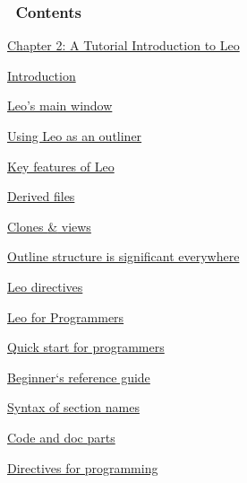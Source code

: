 \documentclass[10pt,a4paper,english]{article}
\begin{document}
\subsubsection*{~\hfill Contents\hfill ~}
\begin{list}{}{}
\item {} \href{\#chapter-2-a-tutorial-introduction-to-leo}{Chapter 2: A Tutorial Introduction to Leo}
\begin{list}{}{}
\item {} \href{\#introduction}{Introduction}
\begin{list}{}{}
\item {} \href{\#leo-s-main-window}{Leo's main window}

\item {} \href{\#using-leo-as-an-outliner}{Using Leo as an outliner}

\end{list}

\item {} \href{\#key-features-of-leo}{Key features of Leo}
\begin{list}{}{}
\item {} \href{\#derived-files}{Derived files}

\item {} \href{\#clones-views}{Clones {\&} views}

\item {} \href{\#outline-structure-is-significant-everywhere}{Outline structure is significant everywhere}

\item {} \href{\#leo-directives}{Leo directives}

\end{list}

\item {} \href{\#leo-for-programmers}{Leo for Programmers}
\begin{list}{}{}
\item {} \href{\#quick-start-for-programmers}{Quick start for programmers}

\item {} \href{\#beginner-s-reference-guide}{Beginner`s reference guide}
\begin{list}{}{}
\item {} \href{\#syntax-of-section-names}{Syntax of section names}

\item {} \href{\#code-and-doc-parts}{Code and doc parts}

\item {} \href{\#directives-for-programming}{Directives for programming}


\end{list}
\end{list}
\end{list}
\end{list}
\end{document}
